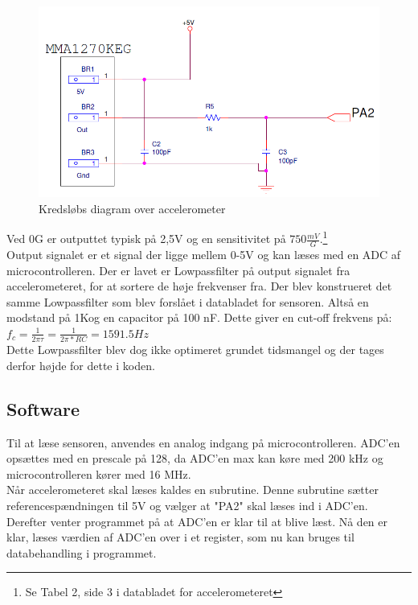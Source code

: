 \begin{figure}[h!]
\centering
\includegraphics[scale=0.6]{./Graphics/Accelerometer_diagram}
\caption{Kredsløbs diagram over accelerometer}
\label{diagram_acc}
\end{figure}

Ved 0G er outputtet typisk på 2,5V og en sensitivitet på $750\frac{mV}{G}$.\footnote{Se Tabel 2, side 3 i databladet for accelerometeret}  \\
Output signalet er et signal der ligge mellem 0-5V og kan læses med en ADC af microcontrolleren.
Der er lavet er Lowpassfilter på output signalet fra accelerometeret, for at sortere de høje frekvenser fra. Der blev konstrueret det samme Lowpassfilter som blev forslået i databladet for sensoren. Altså en modstand på 1K\ohm og en capacitor på 100 nF. Dette giver en cut-off frekvens på:\\$f_{c}=\frac{1}{2\pi\tau}=\frac{1}{2\pi*RC}=1591.5 Hz$\\

Dette Lowpassfilter blev dog ikke optimeret grundet tidsmangel og der tages derfor højde for dette i koden.\\

\subsection{Software}
Til at læse sensoren, anvendes en analog indgang på microcontrolleren. ADC'en opsættes med en prescale på 128, da ADC'en max kan køre med 200 kHz og microcontrolleren kører med 16 MHz. \\
Når accelerometeret skal læses kaldes en subrutine. Denne subrutine sætter referencespændningen til 5V og vælger at "PA2" skal læses ind i ADC'en. Derefter venter programmet på at ADC'en er klar til at blive læst. Nå den er klar, læses værdien af ADC'en over i et register, som nu kan bruges til databehandling i programmet.\\


